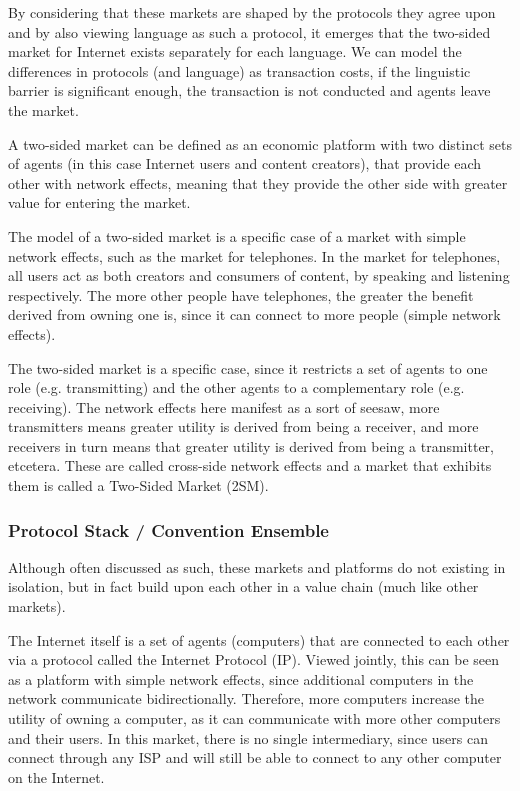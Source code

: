 \documentclass[a4paper,british]{article}\usepackage[]{graphicx}\usepackage[]{color}
\begin{document}
By considering that these markets are shaped by the protocols they
agree upon and by also viewing language as such a protocol, it emerges
that the two-sided market for Internet exists separately for each
language. We can model the differences in protocols (and language)
as transaction costs, if the linguistic barrier is significant enough,
the transaction is not conducted and agents leave the market.

A two-sided market can be defined as an economic platform with two
distinct sets of agents (in this case Internet users and content creators),
that provide each other with network effects, meaning that they provide
the other side with greater value for entering the market. 

The model of a two-sided market is a specific case of a market with
simple network effects, such as the market for telephones. In the
market for telephones, all users act as both creators and consumers
of content, by speaking and listening respectively. The more other
people have telephones, the greater the benefit derived from owning
one is, since it can connect to more people (simple network effects).

The two-sided market is a specific case, since it restricts a set
of agents to one role (e.g. transmitting) and the other agents to
a complementary role (e.g. receiving). The network effects here manifest
as a sort of seesaw, more transmitters means greater utility is derived
from being a receiver, and more receivers in turn means that greater
utility is derived from being a transmitter, etcetera. These are called
cross-side network effects and a market that exhibits them is called
a Two-Sided Market (2SM). 

\subsubsection*{Protocol Stack / Convention Ensemble}

Although often discussed as such, these markets and platforms do not
existing in isolation, but in fact build upon each other in a value
chain (much like other markets).

The Internet itself is a set of agents (computers) that are connected
to each other via a protocol called the Internet Protocol (IP). Viewed
jointly, this can be seen as a platform with simple network effects,
since additional computers in the network communicate bidirectionally.
Therefore, more computers increase the utility of owning a computer,
as it can communicate with more other computers and their users. In
this market, there is no single intermediary, since users can connect
through any ISP and will still be able to connect to any other computer
on the Internet.
\end{document}
